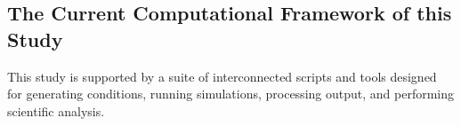 \subsection{The Current Computational Framework of this Study}
This study is supported by a suite of interconnected scripts and tools designed for generating conditions, running simulations, processing output, and performing scientific analysis.


